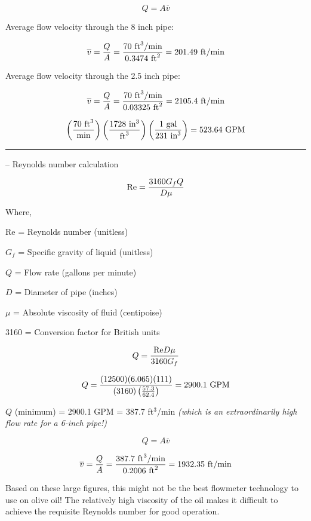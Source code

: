 $$Q = A \overline{v}$$

Average flow velocity through the 8 inch pipe:

$$\overline{v} = {Q \over A} = {70 \hbox{ ft}^3/\hbox{min} \over 0.3474 \hbox{ ft}^2} = 201.49 \hbox{ ft/min}$$

\vskip 10pt

Average flow velocity through the 2.5 inch pipe:

$$\overline{v} = {Q \over A} = {70 \hbox{ ft}^3/\hbox{min} \over 0.03325 \hbox{ ft}^2} = 2105.4 \hbox{ ft/min}$$

\vskip 10pt

$$\left({70 \hbox{ ft}^3 \over \hbox{min}}\right) \left({1728 \hbox{ in}^3 \over \hbox{ft}^3}\right) \left({1 \hbox{ gal} \over 231 \hbox{ in}^3} \right) = 523.64 \hbox{ GPM}$$


\filbreak \vskip 5pt \hrule \vskip 5pt  -- Reynolds number calculation \vskip 10pt

$$\hbox{Re} = {{3160 G_f Q} \over {D \mu}}$$

\noindent
Where,

Re = Reynolds number (unitless)

$G_f$ = Specific gravity of liquid (unitless)

$Q$ = Flow rate (gallons per minute)

$D$ = Diameter of pipe (inches)

$\mu$ = Absolute viscosity of fluid (centipoise)

3160 = Conversion factor for British units

\vskip 10pt


$$Q = {\hbox{Re} D \mu \over 3160 G_f}$$

$$Q = {(12500) (6.065) (111) \over (3160) \left(57.3 \over 62.4\right)} = 2900.1 \hbox{ GPM}$$

$Q$ (minimum) = 2900.1 GPM = 387.7 ft$^{3}$/min {\it (which is an extraordinarily high flow rate for a 6-inch pipe!)}

\vskip 10pt

$$Q = A \overline{v}$$

$$\overline{v} = {Q \over A} = {387.7 \hbox{ ft}^3\hbox{/min} \over 0.2006 \hbox{ ft}^2} = 1932.35 \hbox{ ft/min}$$

\vskip 10pt

Based on these large figures, this might not be the best flowmeter technology to use on olive oil!  The relatively high viscosity of the oil makes it difficult to achieve the requisite Reynolds number for good operation.


